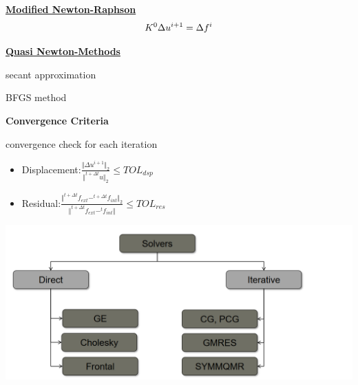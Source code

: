 \documentclass[landscape,a0paper,fontscale=0.285]{baposter} %
\newcommand{\compresslist}{ %
\setlength{\itemsep}{1pt}
\setlength{\parskip}{0pt}
\setlength{\parsep}{0pt}
}
\begin{document}
\begin{poster}
{%



\underline{\textbf{Modified Newton-Raphson}}\vspace{-0.2cm}
$$\vspace{-0.3cm}
K^0 \Delta u^{i+1} = \Delta f^{i}
$$



\underline{\textbf{Quasi Newton-Methods}}

secant approximation

BFGS method


\textbf{Convergence Criteria}

convergence check for each iteration\vspace{-0.2cm}
\begin{itemize}\compresslist
    \item Displacement:$\frac{\Vert \Delta u^{i+1}\Vert_2}{\Vert ^{t+\Delta t}u\Vert_2} \le TOL_{dsp}$
    \item Residual:$\frac{\Vert ^{t+\Delta t}f_{ext} - ^{t+\Delta t}f_{int}\Vert_2}{\Vert ^{t+\Delta t}f_{ext} - ^{t}f_{int} \Vert} \le TOL_{res}$
\end{itemize}


\colorbox[HTML]{CCFFFF}{}\vspace{-0.3cm}

\begin{center}
\includegraphics[width=\textwidth, trim={0 0.2cm 0.5cm 1cm},clip]{figures/ETHz_AFEA_FEM_Implicit_Solution_iteration.png}
\end{center}\vspace{-0.3cm}

}
\end{poster}
\end{document}
